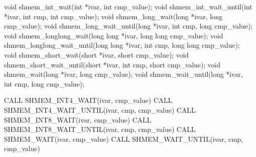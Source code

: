 \label{subsec:shmem_wait}
\synC   %

void shmem_int_wait(int *ivar, int cmp_value);
void shmem_int_wait_until(int *ivar, int cmp, int cmp_value);
void shmem_long_wait(long *ivar, long cmp_value);
void shmem_long_wait_until(long *ivar, int cmp, long cmp_value);
void shmem_longlong_wait(long long *ivar, long long cmp_value);
void shmem_longlong_wait_until(long long *ivar, int cmp, long long cmp_value);
void shmem_short_wait(short *ivar, short cmp_value);
void shmem_short_wait_until(short *ivar, int cmp, short cmp_value);
void shmem_wait(long *ivar, long cmp_value);
void shmem_wait_until(long *ivar, int cmp, long cmp_value);%
%

\synF   %

CALL SHMEM_INT4_WAIT(ivar, cmp_value)
CALL SHMEM_INT4_WAIT_UNTIL(ivar, cmp, cmp_value)
CALL SHMEM_INT8_WAIT(ivar, cmp_value)
CALL SHMEM_INT8_WAIT_UNTIL(ivar, cmp, cmp_value)
CALL SHMEM_WAIT(ivar, cmp_value)
CALL SHMEM_WAIT_UNTIL(ivar, cmp, cmp_value) %

